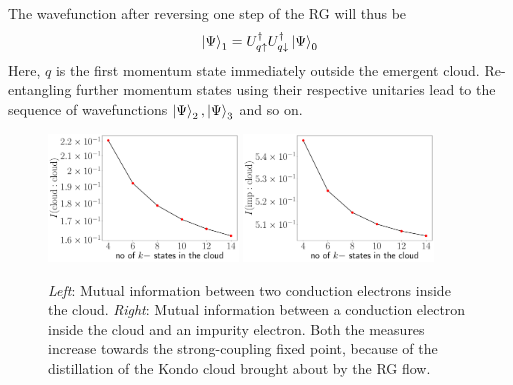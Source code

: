 \documentclass{report}
\numberwithin{equation}{section}
\begin{document}
The wavefunction after reversing one step of the RG will thus be
\begin{equation}\begin{aligned}
	\ket{\Psi}_1 = U^\dagger_{q \uparrow}U^\dagger_{q \downarrow}\ket{\Psi}_0
\end{aligned}\end{equation}
Here, \(q\) is the first momentum state immediately outside the emergent cloud. Re-entangling further momentum states using their respective unitaries lead to the sequence of wavefunctions \(\ket{\Psi}_2, \ket{\Psi}_3\) and so on.

\begin{figure}[!htbp]
	\centering
	\includegraphics[width=0.45\textwidth]{../figures/mut_I_ee.pdf}
	\includegraphics[width=0.45\textwidth]{../figures/mut_I_ie.pdf}
	\caption{\textit{Left}: Mutual information between two conduction electrons inside the cloud. \textit{Right}: Mutual information between a conduction electron inside the cloud and an impurity electron. Both the measures increase towards the strong-coupling fixed point, because of the distillation of the Kondo cloud brought about by the RG flow.}
	\label{mutI}
\end{figure}
\end{document}
